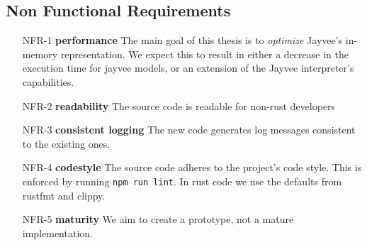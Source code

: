 %



\subsection{Non Functional Requirements}
\label{subsection:NonFunctionalRequirements}

\begin{enumerate}
	\item[NFR-1] \textbf{performance} The main goal of this thesis is to \emph{optimize} Jayvee's in-memory representation.
	      We expect this to result in either a decrease in the execution time for jayvee models, or an extension of the Jayvee interpreter's capabilities.
	\item[NFR-2] \textbf{readability} The source code is readable for non-rust developers
	\item[NFR-3] \textbf{consistent logging} The new code generates log messages consistent to the existing ones.
	\item[NFR-4] \textbf{codestyle} The source code adheres to the project's code style.
	      This is enforced by running \Verb|npm run lint|.
	      In rust code we use the defaults from rustfmt and clippy.
	\item[NFR-5] \textbf{maturity} We aim to create a prototype, not a mature implementation.
\end{enumerate}

